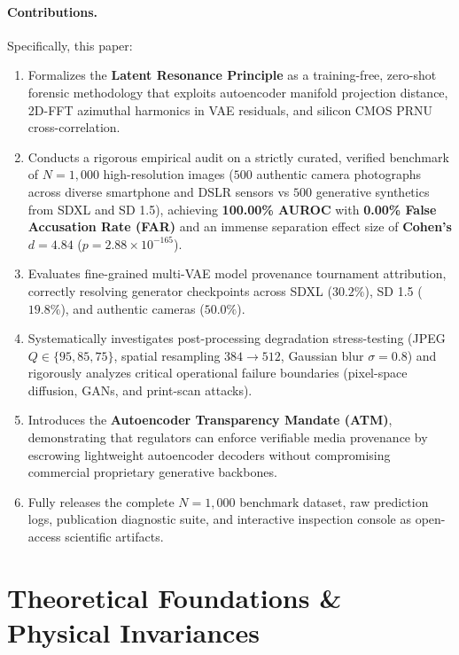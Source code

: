 \documentclass{article}
\theoremstyle{definition}
\begin{document}
\paragraph{Contributions.} Specifically, this paper:
\begin{enumerate}
    \item Formalizes the \textbf{Latent Resonance Principle} as a training-free, zero-shot forensic methodology that exploits autoencoder manifold projection distance, 2D-FFT azimuthal harmonics in VAE residuals, and silicon CMOS PRNU cross-correlation.
    \item Conducts a rigorous empirical audit on a strictly curated, verified benchmark of $N=1,000$ high-resolution images ($500$ authentic camera photographs across diverse smartphone and DSLR sensors vs $500$ generative synthetics from SDXL and SD 1.5), achieving \textbf{100.00\% AUROC} with \textbf{0.00\% False Accusation Rate (FAR)} and an immense separation effect size of \textbf{Cohen's $d = 4.84$} ($p = 2.88 \times 10^{-165}$).
    \item Evaluates fine-grained multi-VAE model provenance tournament attribution, correctly resolving generator checkpoints across SDXL ($30.2\%$), SD 1.5 ($19.8\%$), and authentic cameras ($50.0\%$).
    \item Systematically investigates post-processing degradation stress-testing (JPEG $Q \in \{95, 85, 75\}$, spatial resampling $384 \to 512$, Gaussian blur $\sigma = 0.8$) and rigorously analyzes critical operational failure boundaries (pixel-space diffusion, GANs, and print-scan attacks).
    \item Introduces the \textbf{Autoencoder Transparency Mandate (ATM)}, demonstrating that regulators can enforce verifiable media provenance by escrowing lightweight autoencoder decoders without compromising commercial proprietary generative backbones.
    \item Fully releases the complete $N=1,000$ benchmark dataset, raw prediction logs, publication diagnostic suite, and interactive inspection console as open-access scientific artifacts.
\end{enumerate}

\section{Theoretical Foundations \& Physical Invariances}
\label{sec:theory}
\end{document}
